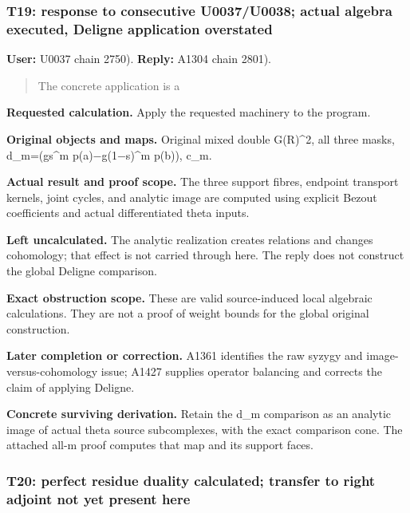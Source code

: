 \subsubsection{T19: response to consecutive U0037/U0038; actual algebra
executed, Deligne application
overstated}\label{TranscriptLedgerStage:t19-response-to-consecutive-u0037u0038-actual-algebra-executed-deligne-application-overstated}

\textbf{User:} U0037
\protect{} chain 2750).
\textbf{Reply:} A1304
\protect{} chain 2801).

\begin{quote}
The concrete application is a
\end{quote}

\textbf{Requested calculation.} Apply the requested machinery to the
program.

\textbf{Original objects and maps.} Original mixed double G(R)\^{}2, all
three masks, d\_m=(gs\^{}m
p(a)\allowbreak{}\ensuremath{−}\allowbreak{}g(1\allowbreak{}\ensuremath{−}\allowbreak{}s)\textasciicircum{}m
p(b)), c\_m.

\textbf{Actual result and proof scope.} The three support fibres,
endpoint transport kernels, joint cycles, and analytic image are
computed using explicit Bezout coefficients and actual differentiated
theta inputs.

\textbf{Left uncalculated.} The analytic realization creates relations
and changes cohomology; that effect is not carried through here. The
reply does not construct the global Deligne comparison.

\textbf{Exact obstruction scope.} These are valid source-induced local
algebraic calculations. They are not a proof of weight bounds for the
global original construction.

\textbf{Later completion or correction.} A1361 identifies the raw syzygy
and image-versus-cohomology issue; A1427 supplies operator balancing and
corrects the claim of applying Deligne.

\textbf{Concrete surviving derivation.} Retain the d\_m comparison as an
analytic image of actual theta source subcomplexes, with the exact
comparison cone. The attached all-m proof computes that map and its
support faces.

\subsubsection{T20: perfect residue duality calculated; transfer to
right adjoint not yet present
here}\label{TranscriptLedgerStage:t20-perfect-residue-duality-calculated-transfer-to-right-adjoint-not-yet-present-here}

